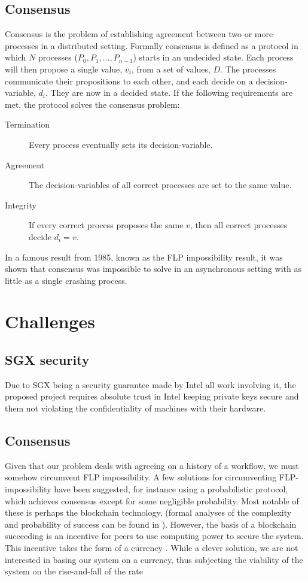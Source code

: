 \documentclass{article}
\begin{document}
		\subsection{Consensus}
		Consensus is the problem of establishing agreement between two or more processes in a distributed setting. Formally consensus is defined as a protocol in which $N$ processes ($P_0, P_1, \dots, P_{n-1}$) starts in an undecided state. Each process will then propose a single value, $v_i$, from a set of values, $D$. The processes communicate their propositions to each other, and each decide on a decision-variable, $d_i$. They are now in a decided state. If the following requirements are met, the protocol solves the consensus problem:
		\begin{description}
			\item[Termination] Every process eventually sets its decision-variable. 
			\item[Agreement] The decision-variables of all correct processes are set to the same value.
			\item[Integrity] If every correct process proposes the same $v$, then all correct processes decide $d_i = v$.
		\end{description}

		In a famous result from 1985, known as the FLP impossibility result\cite{flp}, it was shown that consensus was impossible to solve in an asynchronous setting with as little as a single crashing process.\\

	\section{Challenges}

		\subsection{SGX security}

		Due to SGX being a security guarantee made by Intel all work involving it, the proposed project requires absolute trust in Intel keeping private keys secure and them not violating the confidentiality of machines with their hardware.

		\subsection{Consensus}
		Given that our problem deals with agreeing on a history of a workflow, we must somehow circumvent FLP impossibility.
		A few solutions for circumventing FLP-impossibility have been suggested, for instance using a probabilistic protocol, which achieves consensus except for some negligible probability. Most notable of these is perhaps the blockchain technology, (formal analyses of the complexity and probability of success can be found in \cite{miller2014anonymous}). However, the basis of a blockchain succeeding is an incentive for peers to use computing power to secure the system. This incentive takes the form of a currency \cite{bitcoin-white-paper}. While a clever solution, we are not interested in basing our system on a currency, thus subjecting the viability of the system on the rise-and-fall of the rate 
\end{document}
